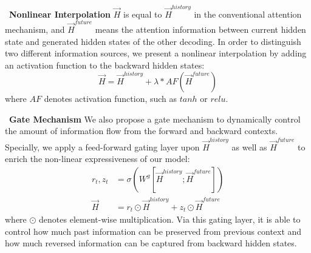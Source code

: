 \documentclass[11pt,a4paper]{article}
\begin{document}
\begin{CJK*}{UTF8}{gbsn}
~\textbf{Nonlinear Interpolation} $\overrightarrow{H}$ is equal to $\overrightarrow{H}^{history}$ in the conventional attention mechanism, and $\overrightarrow{H}^{future}$ means the attention information between current hidden state and generated hidden states of the other decoding. In order to distinguish two different information sources, we present a nonlinear interpolation by adding an activation function to the backward hidden states:
\begin{equation} \label{Nonlinear}
  \overrightarrow{H} = \overrightarrow{H}^{history} + \lambda * AF(\overrightarrow{H}^{future})
\end{equation}
where $AF$ denotes activation function, such as $tanh$ or $relu$.

~\textbf{Gate Mechanism} We also propose a gate mechanism to dynamically control the amount of information flow from the forward and backward contexts. Specially, we apply a feed-forward gating layer upon $\overrightarrow{H}^{history}$ as well as $\overrightarrow{H}^{future}$ to enrich the non-linear expressiveness of our model:
\begin{equation} \label{Gate}
\begin{aligned}
  r_t, z_t &= \sigma(W^g[\overrightarrow{H}^{history};\overrightarrow{H}^{future}])  \\
  \overrightarrow{H} &= r_t \odot \overrightarrow{H}^{history} + z_t \odot \overrightarrow{H}^{future}
\end{aligned}
\end{equation}
where $\odot$ denotes element-wise multiplication.
Via this gating layer, it is able to control how much past information can be preserved from previous context and how much reversed information can be captured from backward hidden states.


\end{CJK*}
\end{document}

